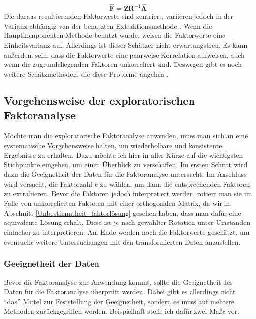 \documentclass[11pt]{scrartcl}
\begin{document}
	\begin{equation}
		\mathbf{\widehat{F}} = \mathbf{Z} \mathbf{R}^{-1} \mathbf{\widehat{\Lambda}}
	\end{equation}
	Die daraus resultierenden Faktorwerte sind zentriert, variieren jedoch in der Varianz
	abhängig von der benutzten Extraktionsmethode \parencite[4]{DiStefano.2009}.
	Wenn die Hauptkomponenten-Methode benutzt wurde, weisen die Faktorwerte
	eine Einheitsvarianz auf.
	Allerdings ist dieser Schätzer nicht erwartungstreu. Es kann außerdem sein, dass die Faktorwerte eine paarweise Korrelation aufweisen, auch wenn die zugrundeliegenden Faktoren unkorreliert sind. Deswegen gibt es noch weitere Schätzmethoden, die diese Probleme angehen \parencite[vgl.][4 - 5]{DiStefano.2009}.

	\newpage
	
	\subsection{Vorgehensweise der exploratorischen Faktoranalyse}
	\label{Vorgehensweise}
	Möchte man die exploratorische Faktoranalyse anwenden, muss man sich an eine
	systematische Vorgehensweise halten, um wiederholbare und konsistente Ergebnisse
	zu erhalten. Dazu möchte ich hier in aller Kürze auf die wichtigsten Stichpunkte eingehen, um einen
	Überblick zu verschaffen.
	Im ersten Schritt wird dazu die Geeignetheit der Daten für die Faktoranalyse
	untersucht. Im Anschluss wird versucht, die Faktorzahl $k$ zu wählen, um dann die entsprechenden
	Faktoren zu extrahieren. Bevor die Faktoren jedoch interpretiert werden, rotiert
	man sie im Falle von unkorrelierten Faktoren mit einer orthogonalen Matrix, da wir in Abschnitt
	\ref{Unbestimmtheit_faktorlösung} gesehen haben, dass man dafür eine äquivalente
	Lösung erhält. Diese ist je nach gewählter Rotation unter Umständen einfacher zu interpretieren.
	Am Ende werden
	noch die Faktorwerte geschätzt, um eventuelle weitere Untersuchungen mit den transformierten
	Daten anzustellen. 
	
	\subsubsection{Geeignetheit der Daten}
	\label{Geeignetheit}
	Bevor die Faktoranalyse zur Anwendung kommt, sollte die Geeignetheit der Daten für
	die Faktoranalyse überprüft werden. Dabei gibt es allerdings nicht \enquote{das} Mittel zur Feststellung
	der Geeignetheit, sondern es muss auf mehrere Methoden zurückgegriffen werden. Beispielhaft stelle ich dafür
	zwei Maße vor.  
	
\end{document}
